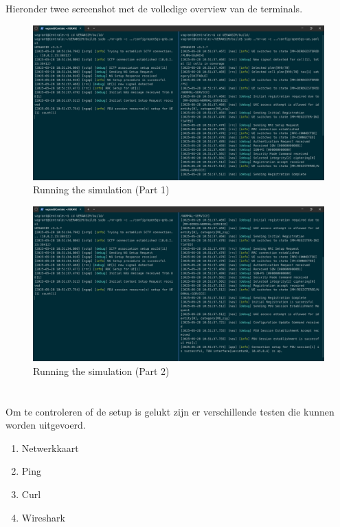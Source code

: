 Hieronder twee screenshot met de volledige overview van de terminals.

\begin{figure}[H]
    \includegraphics[width=\linewidth]{../graphics/POC-Run-1.png}
    \caption{Running the simulation (Part 1)}
    \label{fig:runPart1}
\end{figure}
\begin{figure}[H]
    \includegraphics[width=\linewidth]{../graphics/POC-Run-2.png}
    \caption{Running the simulation (Part 2)}
    \label{fig:runPart2}
\end{figure}

\section{}%
\label{sec:Test}%

Om te controleren of de setup is gelukt zijn er verschillende testen die kunnen worden uitgevoerd.
\begin{enumerate}
    \item Netwerkkaart
    \item Ping
    \item Curl
    \item Wireshark
\end{enumerate}

